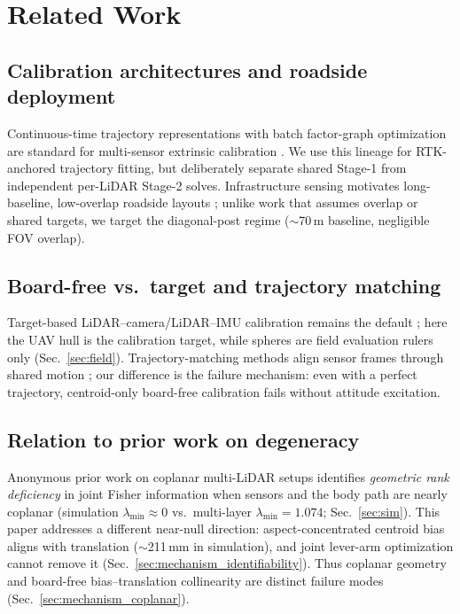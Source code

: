 \section{Related Work}
\label{sec:related}

\subsection{Calibration architectures and roadside deployment}
Continuous-time trajectory representations with batch factor-graph optimization are
standard for multi-sensor extrinsic calibration
\cite{furgale2013unified,rehder2016kalibr}.
We use this lineage for RTK-anchored trajectory fitting, but deliberately separate
shared Stage-1 from independent per-LiDAR Stage-2 solves.
Infrastructure sensing motivates long-baseline, low-overlap roadside layouts
\cite{yu2022dairv2x}; unlike work that assumes overlap or shared targets, we target
the diagonal-post regime ($\sim$70\,m baseline, negligible FOV overlap).

\subsection{Board-free vs.\ target and trajectory matching}
Target-based LiDAR--camera/LiDAR--IMU calibration remains the default
\cite{furgale2013unified,rehder2016kalibr}; here the UAV hull is the calibration
target, while spheres are field evaluation rulers only (Sec.~\ref{sec:field}).
Trajectory-matching methods align sensor frames through shared motion
\cite{ren2023trajmatch}; our difference is the failure mechanism: even with a perfect
trajectory, centroid-only board-free calibration fails without attitude excitation.

\subsection{Relation to prior work on degeneracy}
Anonymous prior work on coplanar multi-LiDAR setups identifies \emph{geometric rank
deficiency} in joint Fisher information when sensors and the body path are nearly
coplanar (simulation $\lambda_{\min}\approx 0$ vs.\ multi-layer $\lambda_{\min}=1.074$;
Sec.~\ref{sec:sim}).
This paper addresses a different near-null direction: aspect-concentrated centroid
bias aligns with translation ($\sim$211\,mm in simulation), and joint lever-arm
optimization cannot remove it (Sec.~\ref{sec:mechanism_identifiability}).
Thus coplanar geometry and board-free bias--translation collinearity are distinct
failure modes (Sec.~\ref{sec:mechanism_coplanar}).
